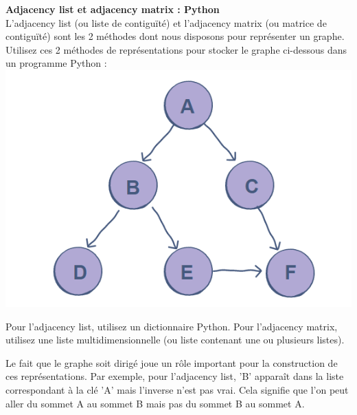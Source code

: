 \begin{Exercice}[5 minutes]  \textbf{Adjacency list et adjacency matrix : Python}\\
    L'adjacency list (ou liste de contiguïté) et l'adjacency matrix (ou matrice de contiguïté) sont les 2 méthodes dont nous disposons pour représenter un graphe. Utilisez ces 2 méthodes de représentations pour stocker le graphe ci-dessous dans un programme Python :\\
    \includegraphics[]{Graphe1.PNG}   

    \begin{conseil}
    Pour l'adjacency list, utilisez un dictionnaire Python. Pour l'adjacency matrix, utilisez une liste multidimensionnelle (ou liste contenant une ou plusieurs listes).
    \end{conseil}
    \begin{solution}
        
        Le fait que le graphe soit dirigé joue un rôle important pour la construction de ces représentations. Par exemple, pour l'adjacency list, 'B' apparaît dans la liste correspondant à la clé 'A' mais l'inverse n'est pas vrai. Cela signifie que l'on peut aller du sommet A au sommet B mais pas du sommet B au sommet A.\\
    \end{solution}
\end{Exercice}


